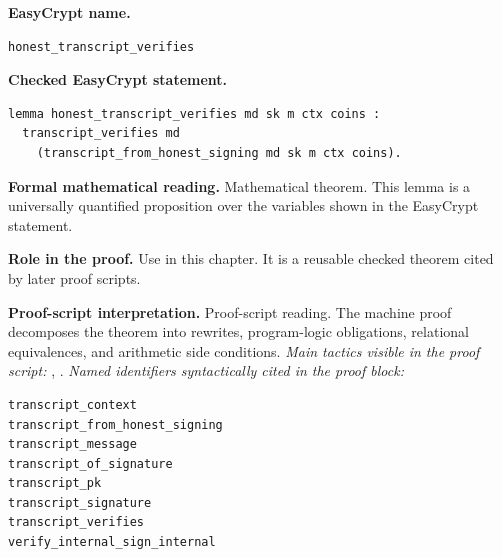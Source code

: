 \begin{formaltheorem}
\noindent\textbf{EasyCrypt name.}
\begin{lstlisting}[language=EasyCrypt,basicstyle=\ttfamily\scriptsize]
honest_transcript_verifies
\end{lstlisting}
\noindent\textbf{Checked EasyCrypt statement.}
\begin{lstlisting}[language=EasyCrypt,basicstyle=\ttfamily\scriptsize]
lemma honest_transcript_verifies md sk m ctx coins :
  transcript_verifies md
    (transcript_from_honest_signing md sk m ctx coins).
\end{lstlisting}
\noindent\textbf{Formal mathematical reading.}
Mathematical theorem. This lemma is a universally quantified proposition over the variables shown in the EasyCrypt statement.

\noindent\textbf{Role in the proof.}
Use in this chapter. It is a reusable checked theorem cited by later proof scripts.

\noindent\textbf{Proof-script interpretation.}
Proof-script reading. The machine proof decomposes the theorem into rewrites, program-logic obligations, relational equivalences, and arithmetic side conditions.
\emph{Main tactics visible in the proof script:} , .
\emph{Named identifiers syntactically cited in the proof block:}
\begin{lstlisting}[language=EasyCrypt,basicstyle=\ttfamily\scriptsize]
transcript_context
transcript_from_honest_signing
transcript_message
transcript_of_signature
transcript_pk
transcript_signature
transcript_verifies
verify_internal_sign_internal
\end{lstlisting}

\end{formaltheorem}

